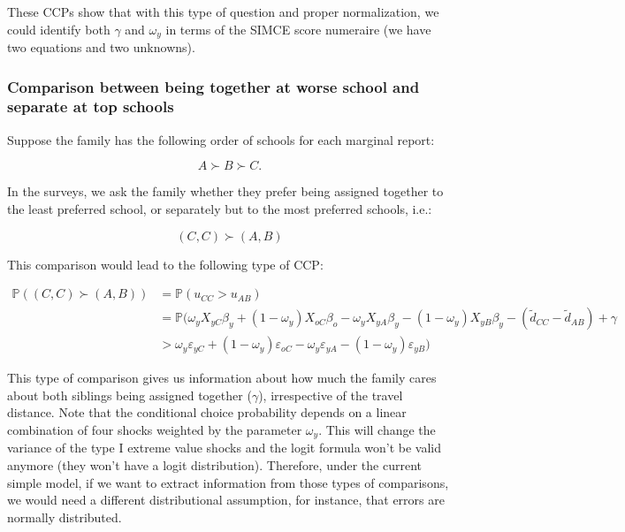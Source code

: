 \documentclass{article}
\begin{document}
These CCPs show that with this type of question and proper normalization, we could identify both $\gamma$ and $\omega_y$ in terms of the SIMCE score numeraire (we have two equations and two unknowns). 

\subsubsection{Comparison between being together at worse school and separate at top schools}

Suppose the family has the following order of schools for each marginal report:

\begin{equation}
    A \succ B \succ C.
\end{equation}

In the surveys, we ask the family whether they prefer being assigned together to the least preferred school, or separately but to the most preferred schools, i.e.:

\begin{equation}
    (C,C) \succ (A, B)
\end{equation}

This comparison would lead to the following type of CCP:

\begin{align*}
    \mathbb{P} \left( (C, C)  \succ (A,B)  \right) &=  \mathbb{P} \left( u_{CC} > u_{AB}  \right) \\
    &= \mathbb{P} ( \omega_y X_{yC}\beta_y  + (1-\omega_y) X_{oC}\beta_o - \omega_y X_{yA}\beta_y - (1 - \omega_y) X_{yB}\beta_y - \left( \tilde{d}_{CC} - \tilde{d}_{AB}\right) + \gamma \\
    & > \omega_y \varepsilon_{yC} + (1 - \omega_y) \varepsilon_{oC} - \omega_y \varepsilon_{yA} - (1 - \omega_y) \varepsilon_{yB} ) 
\end{align*}

This type of comparison gives us information about how much the family cares about both siblings being assigned together ($\gamma$), irrespective of the travel distance. Note that the conditional choice probability depends on a linear combination of four shocks weighted by the parameter $\omega_y$. This will change the variance of the type I extreme value shocks and the logit formula won't be valid anymore (they won't have a logit distribution). Therefore, under the current simple model, if we want to extract information from those types of comparisons, we would need a different distributional assumption, for instance, that errors are normally distributed. 
\end{document}
